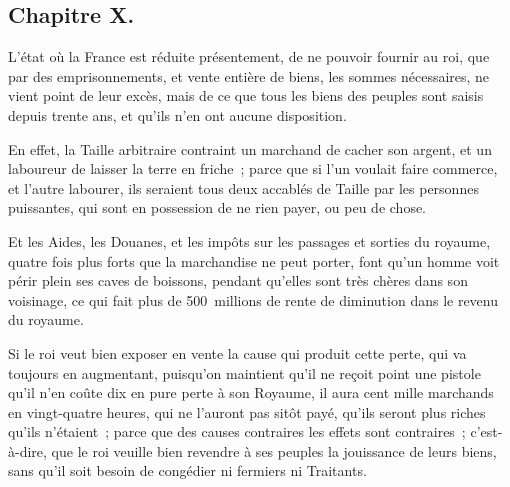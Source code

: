 \documentclass[french,twoside]{book} %
\begin{document}
\subsection[{Chapitre X.}]{Chapitre X.}
\noindent L’état où la France est réduite présentement, de ne pouvoir fournir au roi, que par des emprisonnements, et vente entière de biens, les sommes nécessaires, ne vient point de leur excès, mais de ce que tous les biens des peuples sont saisis depuis trente ans, et qu’ils n’en ont aucune disposition.\par
En effet, la Taille arbitraire contraint un marchand de cacher son argent, et un laboureur de laisser la terre en friche ; parce que si l’un voulait faire commerce, et l’autre labourer, ils seraient tous deux accablés de Taille par les personnes puissantes, qui sont en possession de ne rien payer, ou peu de chose.\par
Et les Aides, les Douanes, et les impôts sur les passages et sorties du royaume, quatre fois plus forts que la marchandise ne peut porter, font qu’un homme voit périr plein ses caves de boissons, pendant qu’elles sont très chères dans son voisinage, ce qui fait plus de 500 millions de rente de diminution dans le revenu du royaume.\par
Si le roi veut bien exposer en vente la cause qui produit cette perte, qui va toujours en augmentant, puisqu’on maintient qu’il ne reçoit point une pistole qu’il n’en coûte dix en pure perte à son Royaume, il aura cent mille marchands en vingt-quatre heures, qui ne l’auront pas sitôt payé, qu’ils seront plus riches qu’ils n’étaient ; parce que des causes contraires les effets sont contraires ; c’est-à-dire, que le roi veuille bien revendre à ses peuples la jouissance de leurs biens, sans qu’il soit besoin de congédier ni fermiers ni Traitants.
\end{document}
